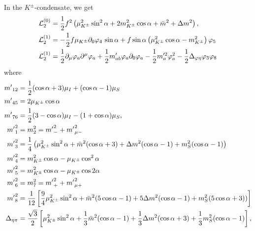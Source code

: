 In the $K^\pm$-condensate, we get
%
\begin{align}
    \label{static three-flavor lagrangian kaon condensate}
    \mathcal{L}^{(0)}_2 
    & =
    \frac{1}{2}f^2 
    \left(
        \mu_{K^\pm}^2 \sin^2\alpha
        + 2m^2_{K^\pm} \cos\alpha
        + \bar m^2 +\Delta m^2
    \right), \\
    \label{linear three-flavor lagrangian kaon condensate}
    \mathcal{L}_2^{(1)}
    & 
    =
    - \frac{1}{2}f\mu_{K^\pm}\partial_0\varphi_4 \, \sin\alpha 
    + f\sin\alpha
    \left(
        \mu_{K^\pm}^2 \cos\alpha
        -m_{K^\pm}^2
    \right)\varphi_5\\
    \label{quadratic three-flavor lagrangian kaon condensate}
    \mathcal{L}_2^{(1)}
    & =
    \frac{1}{2} \partial_\mu \varphi_a \partial^\mu \varphi_a
    + \frac{1}{2}m'_{ab} \varphi_a\partial_0\varphi_a
    - \frac{1}{2}m'^2_{a} \varphi_a^2
    - \frac{1}{2}\Delta_{\varphi\eta} \varphi_3\varphi_8
\end{align}
%
where
%
\begingroup
\allowdisplaybreaks
\begin{align}
    {m'}_{12} &= \frac{1}{2}(\cos\alpha + 3)\mu_I + (\cos\alpha - 1)\mu_S \\
    {m'}_{45} &= 2\mu_{K^\pm}\cos\alpha \\
    {m'}_{76} &= \frac{1}{2}(3-\cos\alpha) \mu_I - (1 + \cos\alpha)\mu_S, \\
    {m'}_1^2 & = m_2^2 = {m'}_-^2 + {m'}_{\mu-}^2\\
    {m'}_3^2 
    & = 
    \frac{1}{4}
    \left(
        \mu_{K^\pm}^2 \sin^2\alpha
        + \bar m^2(\cos\alpha + 3)
        + \Delta m^2 (\cos\alpha -1)
        + m_S^2(\cos\alpha - 1)
    \right)\\
    {m'}_4^2 & = m_{K^\pm}^2\cos\alpha -\mu_{K^\pm} \cos^2\alpha \\
    {m'}_5^2 & = m_{K^\pm}^2\cos\alpha -\mu_{K^\pm} \cos 2\alpha \\
    {m'}_6^2 & = m_7^2 = {m'}_+^2 + {m'}_{\mu+}^2\\
    {m'}_8^2
    & =
    \frac{1}{12}
    \left[
        \frac{9}{4}\mu_{K^\pm}^2\sin^2\alpha
        + \bar m^2(5\cos\alpha-1) 
        + 5\Delta m^2(\cos\alpha-1)
        + m_S^2(5\cos\alpha+3))
    \right] \\
    \Delta_{\eta\pi}
    & =
    \frac{\sqrt{3}}{2}
    \left[
        \mu_{K^\pm}^2\sin^2\alpha
        + \frac{1}{3}\bar m^2(\cos\alpha - 1)
        + \frac{1}{3}\Delta m^2(\cos\alpha + 3)
        + \frac{1}{3}m^2_S(\cos\alpha - 1)
    \right],
\end{align}
